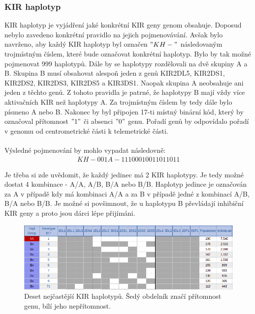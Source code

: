 \documentclass[czech,DP]{thesiskiv}
\numberwithin{equation}{section}
\begin{document}
\subsubsection{KIR haplotyp}
KIR haplotyp je vyjádření jaké konkrétní KIR geny genom obsahuje. Doposud nebylo zavedeno konkrétní pravidlo na jejich pojmenovávání. Avšak bylo navrženo, aby každý KIR haplotyp byl označen $"KH-"$ následovaným trojmístným číslem, které bude označovat konkrétní haplotyp. Bylo by tak možné pojmenovat 999 haplotypů. Dále by se haplotypy rozdělovali na dvě skupiny A a B. Skupina B musí obsahovat alespoň jeden z genů KIR2DL5, KIR2DS1, KIR2DS2, KIR2DS3, KIR2DS5 a KIR3DS1. Naopak skupina A neobsahuje ani jeden z těchto genů. Z tohoto pravidla je patrné, že haplotypy B mají vždy více aktivačních KIR než haplotypy A. Za trojmístným číslem by tedy dále bylo písmeno A nebo B. Nakonec by byl připojen 17-ti místný binární kód, který by označoval přítomnost $"1"$ či absenci $"0"$ genu. Pořadí genů by odpovídalo pořadí v genomu od centrometrické části k telemetrické části. \cite{imgt_hla_database}
\\
\\
Výsledné pojmenování by mohlo vypadat následovně:
\begin{align}
   \label{kir_haplotyp} KH-001A-11100010011011011
\end{align}

\noindent
Je třeba si zde uvědomit, že každý jedinec má 2 KIR haplotypy. Je tedy možné dostat 4 kombinace - A/A, A/B, B/A nebo B/B. Haplotyp jedince je označován za A v případě kdy má kombinaci A/A a za B v případě jedné z kombinací A/B, B/A nebo B/B. Je možné si povšimnout, že u haplotypu B převládají inhibiční KIR geny a proto jsou dárci lépe přijímáni.
 
\begin{figure}[H]		
		\centering
		\includegraphics[width=\textwidth]{./img/KIR_haplotypy_priklad.png}
		\caption{Deset nejčastější KIR haplotypů. Šedý obdelník značí přítomnost genu, bílí jeho nepřítomnost. \cite{kir_genotypes_10}}
		\label{fig:kir_haplotypy_10}
\end{figure}
\end{document}
